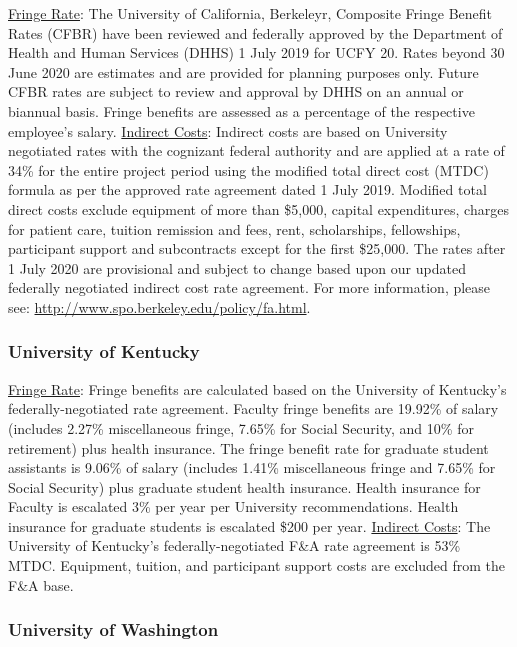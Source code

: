 \documentclass[oneside,11pt]{amsart}
\begin{document}
\underline{Fringe Rate}: The University of California, Berkeleyr,
Composite Fringe Benefit Rates (CFBR) have been reviewed and
federally approved by the Department of Health and Human Services
(DHHS) 1 July 2019 for UCFY 20. Rates beyond 30 June 2020 are
estimates and are provided for planning purposes only. Future CFBR
rates are subject to review and approval by DHHS on an annual or
biannual basis. Fringe benefits are assessed as a percentage of the
respective employee’s salary. \underline{Indirect Costs}: Indirect
costs are based on University negotiated rates with the cognizant
federal authority and are applied at a rate of 34\% for the entire
project period using the modified total direct cost (MTDC) formula as
per the approved rate agreement dated 1 July 2019. Modified total
direct costs exclude equipment of more than \$5,000, capital
expenditures, charges for patient care, tuition remission and fees,
rent, scholarships, fellowships, participant support and subcontracts
except for the first \$25,000. The rates after 1 July 2020 are
provisional and subject to change based upon our updated federally
negotiated indirect cost rate agreement. For more information, please
see: \url{http://www.spo.berkeley.edu/policy/fa.html}.

\subsubsection{University of Kentucky}

\underline{Fringe Rate}: Fringe benefits are calculated based on the
University of Kentucky’s federally-negotiated rate agreement. Faculty
fringe benefits are 19.92\% of salary (includes 2.27\% miscellaneous
fringe, 7.65\% for Social Security, and 10\% for retirement) plus
health insurance. The fringe benefit rate for graduate student
assistants is 9.06\% of salary (includes 1.41\% miscellaneous fringe
and 7.65\% for Social Security) plus graduate student health
insurance. Health insurance for Faculty is escalated 3\% per year per
University recommendations. Health insurance for graduate students is
escalated \$200 per year. \underline{Indirect Costs}: The University
of Kentucky’s federally-negotiated F\&A rate agreement is 53\% MTDC.
Equipment, tuition, and participant support costs are excluded from
the F\&A base.

\subsubsection{University of Washington}
\end{document}
